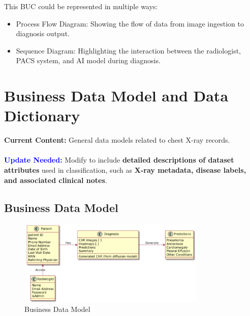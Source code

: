 \documentclass[12pt]{article}
\begin{document}
This BUC could be represented in multiple ways:
\begin{itemize}
    \item Process Flow Diagram: Showing the flow of data from image ingestion to diagnosis output.
    \item Sequence Diagram: Highlighting the interaction between the radiologist, PACS system, and 
        AI model during diagnosis.
\end{itemize}

\section{Business Data Model and Data Dictionary}
\textbf{Current Content:} General data models related to chest X-ray records. \\
\\
\textbf{\textcolor{blue}{Update Needed:}} Modify to include \textbf{detailed descriptions of dataset attributes} used in classification, such as \textbf{X-ray metadata, disease labels, and associated clinical notes}.

\subsection{Business Data Model}
\begin{figure}[H]
    \centering
    \includegraphics[width=0.8\textwidth]{images/bussiness_data_model.png}
    \caption{Business Data Model}
    \label{fig:business_data_model}
\end{figure}
\end{document}
